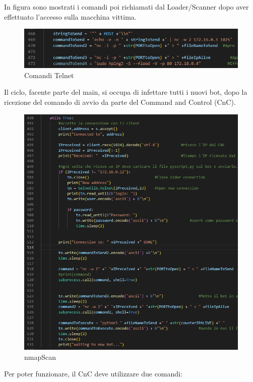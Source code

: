 In figura sono mostrati i comandi poi richiamati dal Loader/Scanner dopo aver effettuato l'accesso sulla macchina vittima.
\begin{figure}[H]
    \centering
    \includegraphics[scale=0.8]{UNINA_MSc_Thesis_Project/img/Codice/comandiTelnet.png}
    \caption{Comandi Telnet}
    \label{fig:my_label}
\end{figure}

Il ciclo, facente parte del main, si occupa di infettare tutti i nuovi bot, dopo la ricezione del comando di avvio da parte del Command and Control (CnC).
\begin{figure}[H]
    \centering
    \includegraphics[scale=0.5]{UNINA_MSc_Thesis_Project/img/Codice/cicloLoading.png}
    \caption{nmapScan}
    \label{fig:my_label}
\end{figure}

Per poter funzionare, il CnC deve utilizzare due comandi: 

